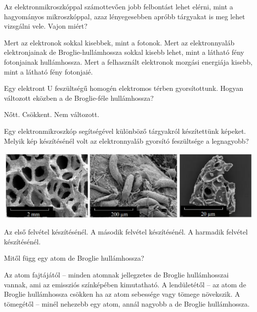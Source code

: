 \documentclass[addpoints,11pt,a4paper]{exam}
\begin{document}
\begin{questions}
\begin{center}
	\end{center}
		  \newpage
		  \question Az elektronmikroszkóppal számottevően jobb felbontást lehet elérni, mint a
		  hagyományos mikroszkóppal, azaz lényegesebben apróbb tárgyakat is meg lehet
		  vizsgálni vele. Vajon miért?
		  \begin{choices}
		  	\choice Mert az elektronok sokkal kisebbek, mint a fotonok.
		  	\choice Mert az elektronnyaláb elektronjainak de Broglie-hullámhossza sokkal kisebb
		  	lehet, mint a látható fény fotonjainak hullámhossza.
		  	\choice Mert a felhasznált elektronok mozgási energiája kisebb, mint a látható fény
		  	fotonjaié.
		  
		  \end{choices}
		 
		 \question Egy elektront U feszültségű homogén elektromos térben gyorsítottunk. Hogyan
		 változott eközben a de Broglie-féle hullámhossza?
		 \begin{choices}
		 	\choice Nőtt.
		 	\choice Csökkent.
		 	\choice Nem változott.
		 \end{choices}
		 
		 \question Egy elektronmikroszkóp segítségével különböző tárgyakról készítettünk képeket.
		 Melyik kép készítésénél volt az elektronnyaláb gyorsító feszültsége a legnagyobb?
		 \begin{center}
		 	\includegraphics[width=\textwidth]{abra02}
		 \end{center}
		\begin{choices}
			\choice Az első felvétel készítésénél.
			\choice A második felvétel készítésénél.
			\choice A harmadik felvétel készítésénél.
			
		\end{choices}		  
		
		\question Mitől függ egy atom de Broglie hullámhossza?
		\begin{choices}
			\choice Az atom fajtájától – minden atomnak jellegzetes de Broglie hullámhosszai vannak,
			ami az emissziós színképében kimutatható.
			\choice A lendületétől – az atom de Broglie hullámhossza csökken ha az atom sebessége
			vagy tömege növekszik.
			\choice A tömegétől – minél nehezebb egy atom, annál nagyobb a de Broglie
			hullámhossza.
		\end{choices}
		

\end{questions}
\end{document}
